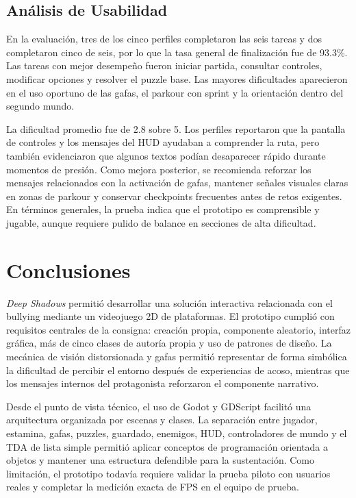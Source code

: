 \documentclass[conference]{IEEEtran}
\begin{document}
\subsection{Análisis de Usabilidad}
En la evaluación, tres de los cinco perfiles completaron las seis tareas y dos completaron cinco de seis, por lo que la tasa general de finalización fue de 93.3\%. Las tareas con mejor desempeño fueron iniciar partida, consultar controles, modificar opciones y resolver el puzzle base. Las mayores dificultades aparecieron en el uso oportuno de las gafas, el parkour con sprint y la orientación dentro del segundo mundo.

La dificultad promedio fue de 2.8 sobre 5. Los perfiles reportaron que la pantalla de controles y los mensajes del HUD ayudaban a comprender la ruta, pero también evidenciaron que algunos textos podían desaparecer rápido durante momentos de presión. Como mejora posterior, se recomienda reforzar los mensajes relacionados con la activación de gafas, mantener señales visuales claras en zonas de parkour y conservar checkpoints frecuentes antes de retos exigentes. En términos generales, la prueba indica que el prototipo es comprensible y jugable, aunque requiere pulido de balance en secciones de alta dificultad.

\FloatBarrier

\section{Conclusiones}
\textit{Deep Shadows} permitió desarrollar una solución interactiva relacionada con el bullying mediante un videojuego 2D de plataformas. El prototipo cumplió con requisitos centrales de la consigna: creación propia, componente aleatorio, interfaz gráfica, más de cinco clases de autoría propia y uso de patrones de diseño. La mecánica de visión distorsionada y gafas permitió representar de forma simbólica la dificultad de percibir el entorno después de experiencias de acoso, mientras que los mensajes internos del protagonista reforzaron el componente narrativo.

Desde el punto de vista técnico, el uso de Godot y GDScript facilitó una arquitectura organizada por escenas y clases. La separación entre jugador, estamina, gafas, puzzles, guardado, enemigos, HUD, controladores de mundo y el TDA de lista simple permitió aplicar conceptos de programación orientada a objetos y mantener una estructura defendible para la sustentación. Como limitación, el prototipo todavía requiere validar la prueba piloto con usuarios reales y completar la medición exacta de FPS en el equipo de prueba.
\end{document}
